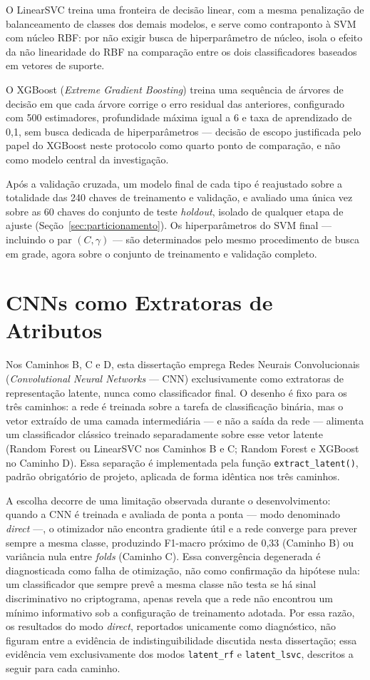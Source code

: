 O LinearSVC treina uma fronteira de decisão linear, com a mesma penalização de balanceamento de classes dos demais modelos, e serve como contraponto à SVM com núcleo RBF: por não exigir busca de hiperparâmetro de núcleo, isola o efeito da não linearidade do RBF na comparação entre os dois classificadores baseados em vetores de suporte.

O XGBoost (\emph{Extreme Gradient Boosting}) treina uma sequência de árvores de decisão em que cada árvore corrige o erro residual das anteriores, configurado com 500 estimadores, profundidade máxima igual a 6 e taxa de aprendizado de 0,1, sem busca dedicada de hiperparâmetros --- decisão de escopo justificada pelo papel do XGBoost neste protocolo como quarto ponto de comparação, e não como modelo central da investigação.

Após a validação cruzada, um modelo final de cada tipo é reajustado sobre a totalidade das 240 chaves de treinamento e validação, e avaliado uma única vez sobre as 60 chaves do conjunto de teste \emph{holdout}, isolado de qualquer etapa de ajuste (Seção~\ref{sec:particionamento}). Os hiperparâmetros do SVM final --- incluindo o par $(C,\gamma)$ --- são determinados pelo mesmo procedimento de busca em grade, agora sobre o conjunto de treinamento e validação completo.

\section{CNNs como Extratoras de Atributos}
\label{sec:cnn-extratoras}

Nos Caminhos B, C e D, esta dissertação emprega Redes Neurais Convolucionais (\emph{Convolutional Neural Networks} --- CNN) exclusivamente como extratoras de representação latente, nunca como classificador final. O desenho é fixo para os três caminhos: a rede é treinada sobre a tarefa de classificação binária, mas o vetor extraído de uma camada intermediária --- e não a saída da rede --- alimenta um classificador clássico treinado separadamente sobre esse vetor latente (Random Forest ou LinearSVC nos Caminhos B e C; Random Forest e XGBoost no Caminho D). Essa separação é implementada pela função \texttt{extract\_latent()}, padrão obrigatório de projeto, aplicada de forma idêntica nos três caminhos.

A escolha decorre de uma limitação observada durante o desenvolvimento: quando a CNN é treinada e avaliada de ponta a ponta --- modo denominado \emph{direct} ---, o otimizador não encontra gradiente útil e a rede converge para prever sempre a mesma classe, produzindo F1-macro próximo de 0,33 (Caminho B) ou variância nula entre \emph{folds} (Caminho C). Essa convergência degenerada é diagnosticada como falha de otimização, não como confirmação da hipótese nula: um classificador que sempre prevê a mesma classe não testa se há sinal discriminativo no criptograma, apenas revela que a rede não encontrou um mínimo informativo sob a configuração de treinamento adotada. Por essa razão, os resultados do modo \emph{direct}, reportados unicamente como diagnóstico, não figuram entre a evidência de indistinguibilidade discutida nesta dissertação; essa evidência vem exclusivamente dos modos \texttt{latent\_rf} e \texttt{latent\_lsvc}, descritos a seguir para cada caminho.

